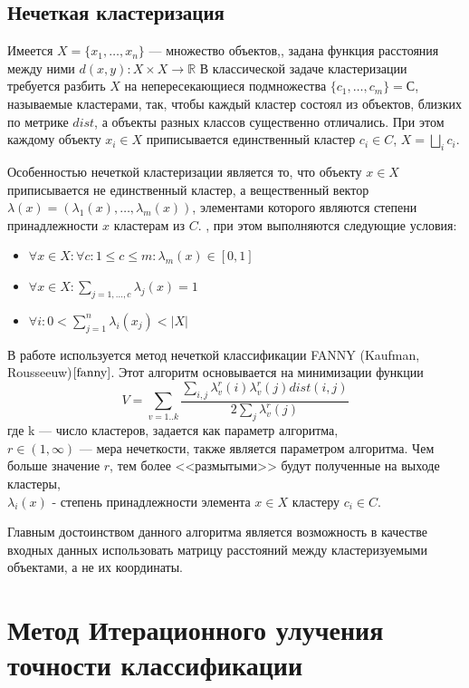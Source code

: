 \documentclass[a4paper, 12pt]{article} %
\begin{document}
\subsection{Нечеткая кластеризация}
Имеется $X=\{x_{1},\dots,x_{n}\}$ --- множество объектов,, задана функция расстояния между ними $d(x, y): X\times X  \to \mathbb{R}$ В классической задаче кластеризации требуется разбить $X$ на непересекающиеся подмножества $\{c_{1},\dots,c_{m}\} = С$,  называемые кластерами, так, чтобы каждый кластер состоял из объектов, близких по метрике $dist$, а объекты разных классов существенно отличались. При этом каждому объекту $x_{i} \in X$ приписывается единственный кластер $c_{i} \in C$, $X = \bigsqcup_{i} c_{i}$.
\par
 Особенностью нечеткой кластеризации является то, что объекту $x \in X$ приписывается не единственный кластер, а вещественный вектор $\lambda(x)=(\lambda_{1}(x),\dots,\lambda_{m}(x))$, элементами которого являются степени принадлежности $x$ кластерам из $C$. , при этом выполняются следующие условия:
 \begin{itemize}
 \item $\forall x \in X: \forall c: 1\leq c \leq m:  \lambda_{m}(x) \in [0,1]$
 \item $\forall x \in X: \sum_{j=1,\dots,c} \lambda_{j}(x) = 1$
 \item $\forall i : 0 < \sum_{j=1}^{n} \lambda_{i}(x_{j}) < |X|  $
 \end{itemize} 
 \par
 В работе используется метод нечеткой классификации FANNY (Kaufman, Rousseeuw)$\cite{fanny}$. Этот алгоритм основывается на минимизации функции 
\[
	V=\sum_{v=1..k} \frac{\sum_{i,j} \lambda_{v}^r(i) \lambda_{v}^r(j) dist(i,j)}{2 \sum_{j} \lambda_{v}^r(j)}
\]
где k --- число кластеров, задается как параметр алгоритма,\\
$r \in (1, \infty)$ --- мера нечеткости, также является параметром алгоритма. Чем больше значение $r$, тем более <<размытыми>> будут полученные на выходе кластеры,\\ $\lambda_{i}(x)$ - степень принадлежности элемента $x \in X$ кластеру $c_{i} \in C$. 
 \par
 Главным достоинством данного алгоритма является возможность в качестве входных данных использовать матрицу расстояний между кластеризуемыми объектами, а не их координаты. 

\section{Метод Итерационного улучения точности классификации}
\end{document}
